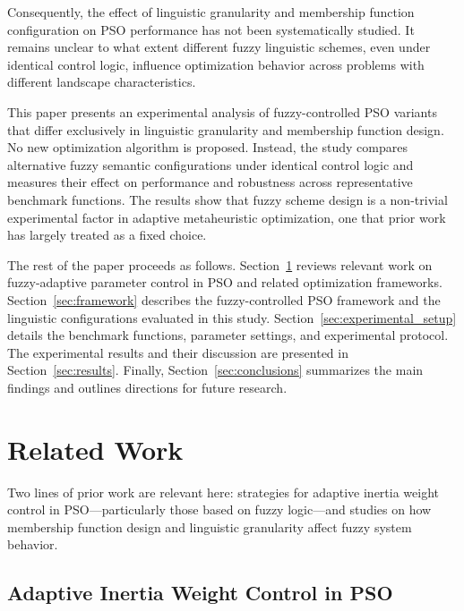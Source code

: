 \documentclass[conference]{IEEEtran}
\begin{document}
Consequently, the effect of linguistic granularity and membership function configuration on PSO performance has not been systematically studied. It remains unclear to what extent different fuzzy linguistic schemes, even under identical control logic, influence optimization behavior across problems with different landscape characteristics.

This paper presents an experimental analysis of fuzzy-controlled PSO variants that differ exclusively in linguistic granularity and membership function design. No new optimization algorithm is proposed. Instead, the study compares alternative fuzzy semantic configurations under identical control logic and measures their effect on performance and robustness across representative benchmark functions. The results show that fuzzy scheme design is a non-trivial experimental factor in adaptive metaheuristic optimization, one that prior work has largely treated as a fixed choice.

The rest of the paper proceeds as follows. Section~\ref{sec:related_work} reviews relevant work on fuzzy-adaptive parameter control in PSO and related optimization frameworks. Section~\ref{sec:framework} describes the fuzzy-controlled PSO framework and the linguistic configurations evaluated in this study. Section~\ref{sec:experimental_setup} details the benchmark functions, parameter settings, and experimental protocol. The experimental results and their discussion are presented in Section~\ref{sec:results}. Finally, Section~\ref{sec:conclusions} summarizes the main findings and outlines directions for future research.

\section{Related Work}
\label{sec:related_work}

Two lines of prior work are relevant here: strategies for adaptive inertia weight control in PSO---particularly those based on fuzzy logic---and studies on how membership function design and linguistic granularity affect fuzzy system behavior.

\subsection{Adaptive Inertia Weight Control in PSO}
\label{subsec:rw_adaptive_w}
\end{document}
